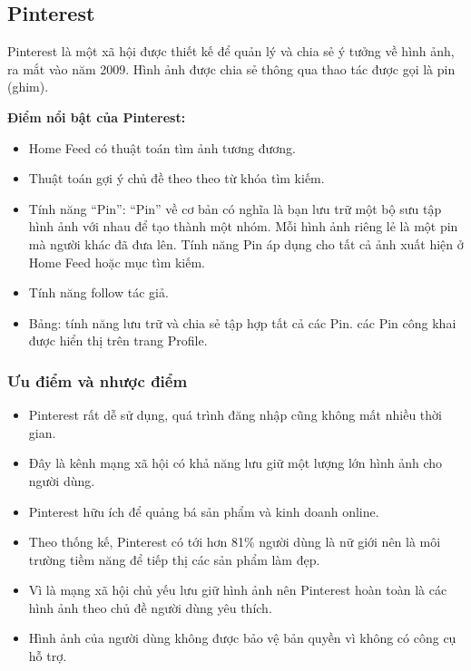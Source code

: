 \par 

\subsection{Pinterest}
Pinterest là một xã hội được thiết kế để quản lý và chia sẻ ý tưởng về hình ảnh, ra mắt vào năm 2009. 
Hình ảnh được chia sẻ thông qua thao tác được gọi là pin (ghim).\par \par 


\textbf{Điểm nổi bật của Pinterest:}
\begin{itemize}
    \item Home Feed có thuật toán tìm ảnh tương đương.
    \item Thuật toán gợi ý chủ đề theo theo từ khóa tìm kiếm.
    \item Tính năng “Pin”: “Pin” về cơ bản có nghĩa là bạn lưu trữ một bộ sưu tập hình ảnh với nhau để tạo thành một nhóm. Mỗi hình ảnh riêng lẻ là một pin mà người khác đã đưa lên. Tính năng Pin áp dụng cho tất cả ảnh xuất hiện ở Home Feed hoặc mục tìm kiếm.
    \item Tính năng follow tác giả.
    \item Bảng: tính năng lưu trữ và chia sẻ tập hợp tất cả các Pin. các Pin công khai được hiển thị trên trang Profile.
\end{itemize}

\subsubsection{Ưu điểm và nhược điểm}
        \begin{itemize}
            \item Pinterest rất dễ sử dụng, quá trình đăng nhập cũng không mất nhiều thời gian.
            \item Đây là kênh mạng xã hội có khả năng lưu giữ một lượng lớn hình ảnh cho người dùng.
            \item Pinterest hữu ích để quảng bá sản phẩm và kinh doanh online.
            \item Theo thống kế, Pinterest có tới hơn 81\% người dùng là nữ giới nên là môi trường tiềm năng để tiếp thị các sản phẩm làm đẹp.
        \end{itemize}

        \begin{itemize}
            \item Vì là mạng xã hội chủ yếu lưu giữ hình ảnh nên Pinterest hoàn toàn là các hình ảnh theo chủ đề người dùng yêu thích.
            \item Hình ảnh của người dùng không được bảo vệ bản quyền vì không có công cụ hỗ trợ.
        \end{itemize}

